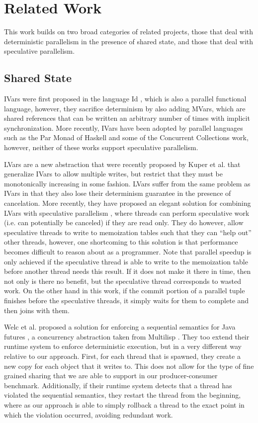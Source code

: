 \section{Related Work}
This work builds on two broad categories of related projects, those that deal with deterministic parallelism in the presence of shared state, and those that deal with speculative parallelism.

\subsection{Shared State}
IVars were first proposed in the language Id \cite{i-structures}, which is also a parallel functional language, however, they sacrifice determinism by also adding MVars, which are shared references that can be written an arbitrary number of times with implicit synchronization.  More recently, IVars have been adopted by parallel languages such as the Par Monad of Haskell \cite{par-monad} and some of the Concurrent Collections work\cite{cnc}, however, neither of these works support speculative parallelism.  

LVars are a new abstraction that were recently proposed by Kuper et al. \cite{lvars-fhpc, freeze-after-writing} that generalize IVars to allow multiple writes, but restrict that they must be monotonically increasing in some fashion.   LVars suffer from the same problem as IVars in that they also lose their determinism guarantee in the presence of cancelation.  More recently, they have proposed an elegant solution for combining LVars with speculative parallelism \cite{lvars-pldi}, where threads can perform speculative work (i.e. can potentially be canceled) if they are read only.  They do however, allow speculative threads to write to memoization tables such that they can ``help out'' other threads, however, one shortcoming to this solution is that performance becomes difficult to reason about as a programmer.  Note that parallel speedup is only achieved if the speculative thread is able to write to the memoization table before another thread needs this result.  If it does not make it there in time, then not only is there no benefit, but the speculative thread corresponds to wasted work.  On the other hand in this work, if the commit  portion of a parallel tuple finishes before the speculative threads, it simply waits for them to complete and then joins with them.

Welc et al. proposed a solution for enforcing a sequential semantics for Java futures \cite{safe-futures, quasi-safe-futures}, a concurrency abstraction taken from Multilisp \cite{multilisp}.  They too extend their runtime system to enforce deterministic execution, but in a very different way relative to our approach.  First, for each thread that is spawned, they create a new copy for each object that it writes to.  This does not allow for the type of fine grained sharing that we are able to support in our producer-consumer benchmark.  Additionally, if their runtime system detects that a thread has violated the sequential semantics, they restart the thread from the beginning, where as our approach is able to simply rollback a thread to the exact point in which the violation occurred, avoiding redundant work.  

